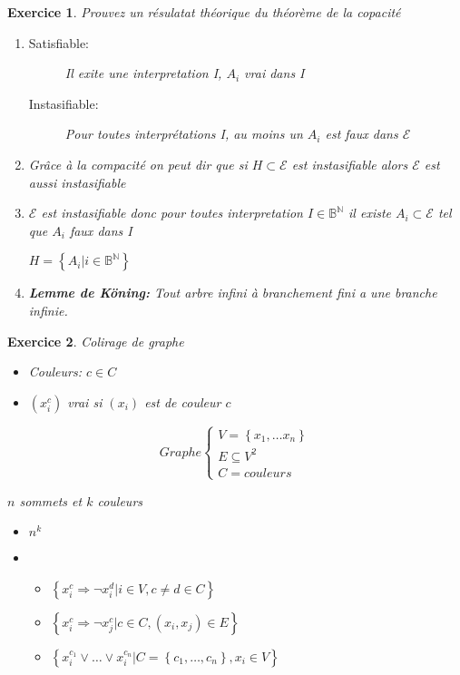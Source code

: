 \documentclass{article}
\theoremstyle{plain}
\newtheorem{exo}{Exercice}%
\begin{document}
\begin{exo}
    Prouvez un résulatat théorique du théorème de la copacité
    \begin{enumerate}
        \item \begin{description}
            \item[Satisfiable:] Il exite une interpretation I, $A_i$ vrai dans I
            \item[Instasifiable:] Pour toutes interprétations I, au moins un
                                $A_i$ est faux dans $\mathcal{E}$   
        \end{description}

        \item Grâce à la compacité on peut dir que si $H \subset \mathcal{E} $ est instasifiable
                alors $\mathcal{E}$ est aussi instasifiable

        \item $\mathcal{E}$ est instasifiable donc pour toutes interpretation
                $I \in \mathbb{B}^{\mathbb{N}}$ il existe 
                $A_i \subset \mathcal{E}$ tel que $A_i$ faux dans I

                $H = \left\{A_i | i \in \mathbb{B}^{\mathbb{N}} \right\}$

        \item \textbf{Lemme de Köning:} Tout arbre infini à branchement 
            fini a une branche infinie.
    \end{enumerate}
\end{exo}

\begin{exo} Colirage de graphe
    \begin{itemize}
        \item Couleurs: $c \in C$
        \item $(x_i^c)$ vrai si $(x_i)$ est de couleur $c$
    \end{itemize}

    \[ Graphe
        \begin{cases}
            V = \left\{x_1, \ldots x_n\right\}  \\
            E \subseteq V^2 \\
            C = couleurs
        \end{cases}
        \]

    $n$ sommets et $k$ couleurs
    \begin{itemize}
        \item $n^k$
        \item 
        \begin{itemize}
            \item $\left\{x_i^c \Rightarrow \neg x_i^d | i \in V, c \neq d \in C\right\}$ 
            \item $\left\{x_i^c \Rightarrow \neg x_j^c | c \in C, (x_i, x_j) \in E\right\}$ 
            \item $\left\{x_i^{c_1}\vee \ldots \vee x_i^{c_n} | C = \left\{c_1, \ldots, c_n\right\}, x_i \in V\right\}$ 
        \end{itemize}
    \end{itemize}
\end{exo}
\end{document}
